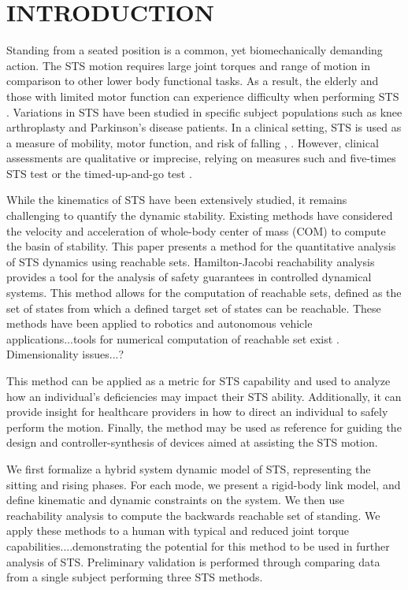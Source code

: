 \section{INTRODUCTION}

Standing from a seated position is a common, yet biomechanically demanding action. The STS motion requires large joint torques and range of motion in comparison to other lower body functional tasks\cite{riley1991}. As a result, the elderly and those with limited motor function can experience difficulty when performing STS \cite{hughes1996}. Variations in STS have been studied in specific subject populations such as knee arthroplasty \cite{su1998} and Parkinson's disease \cite{Mak2013} patients. In a clinical setting, STS is used as a measure of mobility, motor function, and risk of falling \cite{whitney2005}, \cite{campbell1989}. However, clinical assessments are qualitative or imprecise, relying on measures such and five-times STS test \cite{whitney2005} or the timed-up-and-go test \cite{podsiadlo1991}.

While the kinematics of STS have been extensively studied, it remains challenging to quantify the dynamic stability. Existing methods have considered the velocity and acceleration of whole-body center of mass (COM) \cite{fujimoto2012} to compute the basin of stability. This paper presents a method for the quantitative analysis of STS dynamics using reachable sets. Hamilton-Jacobi reachability analysis provides a tool for the analysis of safety guarantees in controlled dynamical systems. This method allows for the computation of reachable sets, defined as the set of states from which a defined target set of states can be reachable. These methods have been applied to robotics and autonomous vehicle applications...tools for numerical computation of reachable set exist \cite{mitchell2004}. Dimensionality issues...?

This method can be applied as a metric for STS capability and used to analyze how an individual's deficiencies may impact their STS ability. Additionally, it can provide insight for healthcare providers in how to direct an individual to safely perform the motion. Finally, the method may be used as reference for guiding the design and controller-synthesis of devices aimed at assisting the STS motion.

We first formalize a hybrid system dynamic model of STS, representing the sitting and rising phases. For each mode, we present a rigid-body link model, and define kinematic and dynamic constraints on the system. We then use reachability analysis to compute the backwards reachable set of standing. We apply these methods to a human with typical and reduced joint torque capabilities....demonstrating the potential for this method to be used in further analysis of STS. Preliminary validation is performed through comparing data from a single subject performing three STS methods. 


